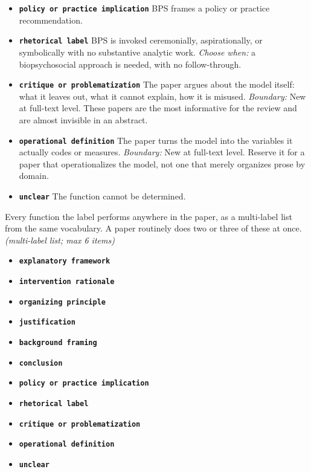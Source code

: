 \documentclass[11pt]{article}
\begin{document}
\begin{description}
\begin{itemize}[leftmargin=1.3em,itemsep=2pt,topsep=2pt]
  \item \textbf{\texttt{policy or practice implication}} BPS frames a policy or practice recommendation.
  \item \textbf{\texttt{rhetorical label}} BPS is invoked ceremonially, aspirationally, or symbolically with no substantive analytic work. {\small \textit{Choose when:} a biopsychosocial approach is needed, with no follow-through.}
  \item \textbf{\texttt{critique or problematization}} The paper argues about the model itself: what it leaves out, what it cannot explain, how it is misused. {\small \textit{Boundary:} New at full-text level. These papers are the most informative for the review and are almost invisible in an abstract.}
  \item \textbf{\texttt{operational definition}} The paper turns the model into the variables it actually codes or measures. {\small \textit{Boundary:} New at full-text level. Reserve it for a paper that operationalizes the model, not one that merely organizes prose by domain.}
  \item \textbf{\texttt{unclear}} The function cannot be determined.
  \end{itemize}
\item[\texttt{bps\_functions\_present}] Every function the label performs anywhere in the paper, as a multi-label list from the same vocabulary. A paper routinely does two or three of these at once. \textit{(multi-label list; max 6 items)}
  \begin{itemize}[leftmargin=1.3em,itemsep=2pt,topsep=2pt]
  \item \textbf{\texttt{explanatory framework}} 
  \item \textbf{\texttt{intervention rationale}} 
  \item \textbf{\texttt{organizing principle}} 
  \item \textbf{\texttt{justification}} 
  \item \textbf{\texttt{background framing}} 
  \item \textbf{\texttt{conclusion}} 
  \item \textbf{\texttt{policy or practice implication}} 
  \item \textbf{\texttt{rhetorical label}} 
  \item \textbf{\texttt{critique or problematization}} 
  \item \textbf{\texttt{operational definition}} 
  \item \textbf{\texttt{unclear}} 
  \end{itemize}

\end{description}
\end{document}
